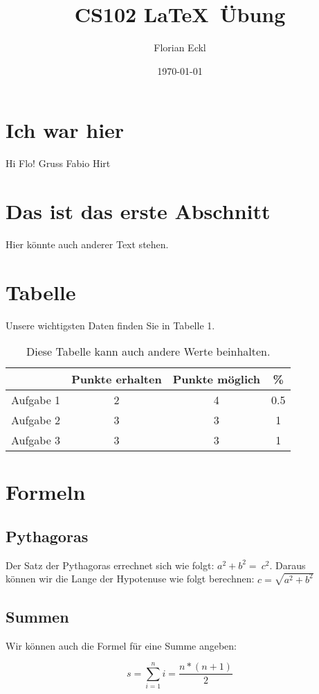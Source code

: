 \documentclass[11pt]{article}
\title{CS102 \LaTeX ~\"Ubung}
\author{Florian Eckl}
\date{\today}
\begin{document}
\maketitle

\section{Ich war hier}
Hi Flo!
Gruss Fabio Hirt

\section{Das ist das erste Abschnitt}

Hier k\"onnte auch anderer Text stehen.

\section{Tabelle}

Unsere wichtigsten Daten finden Sie in Tabelle 1.

\begin{table}[!th]

\centering

\begin{tabular}{c|c|c|c}

& Punkte erhalten & Punkte m\"oglich & \% \\

\hline

Aufgabe 1 & 2 & 4 & 0.5 \\

Aufgabe 2 & 3 & 3 & 1 \\

Aufgabe 3 & 3 & 3 & 1 \\

\end{tabular}

\caption{Diese Tabelle kann auch andere Werte beinhalten.}

\label{table:diese Tabelle kann auch andere Werte beinhalten.}

\end{table}

\section{Formeln}

\subsection{Pythagoras}

Der Satz der Pythagoras errechnet sich wie folgt: $a^{2} + b^{2} =\ c^{2}$. Daraus\\ 
k\"onnen wir die Lange der Hypotenuse wie folgt berechnen: $c =\sqrt{a^{2} + b^{2}}$ 

\subsection{Summen}

Wir k\"onnen auch die Formel f\"ur eine Summe angeben:

\begin{equation}
s = \sum_{i=1}^n i = \frac{n*(n+1)}{2}
\end{equation}
\end{document}
